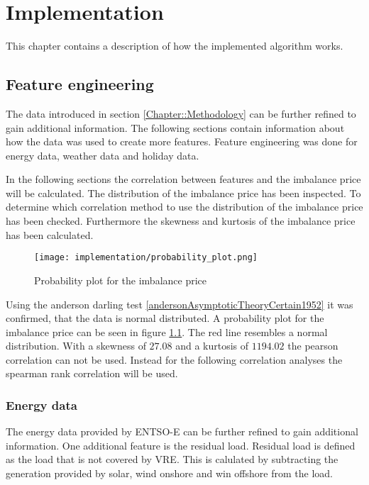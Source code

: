 \documentclass[class=scrbook, crop=false]{standalone}
\begin{document}
\chapter{Implementation} %
\label{Chapter::Implementation}
    This chapter contains a description of how the implemented algorithm works.

\section{Feature engineering}
\label{Section::Feature_engineering}

The data introduced in section \ref{Chapter::Methodology} can be further refined to gain additional information. 
The following sections contain information about how the data was used to create more features.
Feature engineering was done for energy data, weather data and holiday data.

In the following sections the correlation between features and the imbalance price will be calculated.
The distribution of the imbalance price has been inspected. 
To determine which correlation method to use the distribution of the imbalance price has been checked.
Furthermore the skewness and kurtosis of the imbalance price has been calculated.

\begin{figure}[ht]
            \centering
            \texttt{[image: implementation/probability\_plot.png]}
            \caption[Probability plot for the imbalance price]{Probability plot for the imbalance price}
            \label{fig::rebap_distribution}
 \end{figure}

Using the anderson darling test \ref{andersonAsymptoticTheoryCertain1952} it was confirmed, that the data is normal distributed.
A probability plot for the imbalance price can be seen in figure \ref{fig::rebap_distribution}. 
The red line resembles a normal distribution. 
With a skewness of $27.08$ and a kurtosis of $1194.02$ the pearson correlation can not be used.
Instead for the following correlation analyses the spearman rank correlation will be used.

    \subsection{Energy data}
    \label{Section::Energy_Data}
    The energy data provided by ENTSO-E can be further refined to gain additional information.
    One additional feature is the residual load. 
    Residual load is defined as the load that is not covered by VRE. 
    This is calulated by subtracting the generation provided by solar, wind onshore and win offshore from the load.
    
\end{document}
